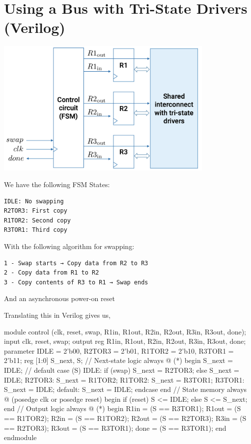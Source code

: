 \documentclass[12pt,openany]{book}
\begin{document}
\section{Using a Bus with Tri-State Drivers (Verilog)}

\begin{minipage}[htp]{0.6\textwidth}
	\begin{center}
		\includegraphics[width=0.8\textwidth]{circuits/18.1.1.png}
	\end{center}
\end{minipage}
\hfill
\vline
\hfill
\begin{minipage}[htp]{0.3\textwidth}
We have the following FSM States:
\begin{verbatim}
IDLE: No swapping
R2TOR3: First copy
R1TOR2: Second copy
R3TOR1: Third copy
\end{verbatim}	
\end{minipage}
\newline
With the following algorithm for swapping:
\begin{verbatim}
1 - Swap starts → Copy data from R2 to R3
2 - Copy data from R1 to R2
3 - Copy contents of R3 to R1 → Swap ends
\end{verbatim}
And an asynchronous power-on reset

\begin{minipage}[htp]{1\textwidth}
	Translating this in Verilog gives us,
	\begin{vhdl}
	module control (clk, reset, swap, R1in, R1out, R2in, R2out, R3in, R3out, done);
		input clk, reset, swap;
		output reg R1in, R1out, R2in, R2out, R3in, R3out, done;
		parameter IDLE = 2'b00, R2TOR3 = 2'b01, R1TOR2 = 2'b10, R3TOR1 = 2'b11;
		reg [1:0] S_next, S;
		// Next-state logic
		always @ (*) begin
			S_next = IDLE; // default
			case (S)
			IDLE: if (swap) S_next = R2TOR3;
				else S_next = IDLE;
				R2TOR3: S_next = R1TOR2;
				R1TOR2: S_next = R3TOR1;
				R3TOR1: S_next = IDLE;
				default: S_next = IDLE;
		endcase
		end
		// State memory
		always @ (posedge clk or posedge reset) begin
				if (reset) S <= IDLE;
				else S <= S_next;
			end
			// Output logic
			always @ (*) begin
				R1in = (S == R3TOR1);
				R1out = (S == R1TOR2);
				R2in = (S == R1TOR2);
				R2out = (S == R2TOR3);
				R3in = (S == R2TOR3);
				R3out = (S == R3TOR1);
				done = (S == R3TOR1);
		end
	endmodule
	\end{vhdl}
	
\end{minipage}
\newline
\end{document}
